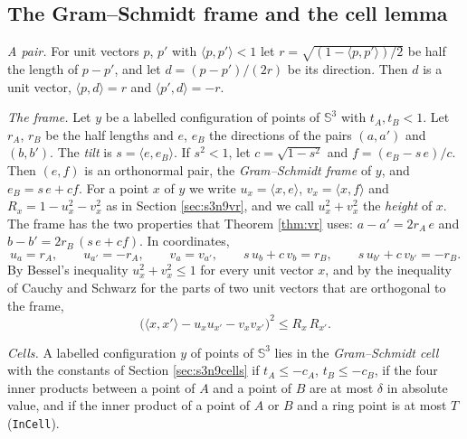 \documentclass[reqno,a4paper,11pt]{amsart}
\numberwithin{equation}{section}
\newcommand{\Sph}{\mathbb{S}}
\newcommand{\lean}[1]{\texttt{#1}}
\begin{document}
\subsection{The Gram--Schmidt frame and the cell lemma}\label{sec:frame}

\emph{A pair.} For unit vectors $p$, $p'$ with $\langle p, p' \rangle < 1$ let $r = \sqrt{(1 - \langle p, p' \rangle)/2}$ be half the length of $p - p'$, and let $d = (p - p')/(2r)$ be its direction. Then $d$ is a unit vector, $\langle p, d \rangle = r$ and $\langle p', d \rangle = -r$.

\emph{The frame.} Let $y$ be a labelled configuration of points of $\Sph^3$ with $t_A, t_B < 1$. Let $r_A$, $r_B$ be the half lengths and $e$, $e_B$ the directions of the pairs $(a, a')$ and $(b, b')$. The \emph{tilt} is $s = \langle e, e_B \rangle$. If $s^2 < 1$, let $c = \sqrt{1 - s^2}$ and $f = (e_B - s \, e)/c$. Then $(e, f)$ is an orthonormal pair, the \emph{Gram--Schmidt frame} of $y$, and $e_B = s \, e + c f$. For a point $x$ of $y$ we write $u_x = \langle x, e \rangle$, $v_x = \langle x, f \rangle$ and $R_x = 1 - u_x^2 - v_x^2$ as in Section \ref{sec:s3n9vr}, and we call $u_x^2 + v_x^2$ the \emph{height} of $x$. The frame has the two properties that Theorem \ref{thm:vr} uses: $a - a' = 2 r_A \, e$ and $b - b' = 2 r_B \, (s \, e + c f)$. In coordinates,
\begin{equation}\label{eq:frameid}
u_a = r_A, \qquad u_{a'} = -r_A, \qquad v_a = v_{a'}, \qquad s \, u_b + c \, v_b = r_B, \qquad s \, u_{b'} + c \, v_{b'} = -r_B .
\end{equation}
By Bessel's inequality $u_x^2 + v_x^2 \leq 1$ for every unit vector $x$, and by the inequality of Cauchy and Schwarz for the parts of two unit vectors that are orthogonal to the frame,
\begin{equation}\label{eq:framecs}
\big( \langle x, x' \rangle - u_x u_{x'} - v_x v_{x'} \big)^2 \leq R_x \, R_{x'} .
\end{equation}

\emph{Cells.} A labelled configuration $y$ of points of $\Sph^3$ lies in the \emph{Gram--Schmidt cell} with the constants of Section \ref{sec:s3n9cells} if $t_A \leq -c_A$, $t_B \leq -c_B$, if the four inner products between a point of $A$ and a point of $B$ are at most $\delta$ in absolute value, and if the inner product of a point of $A$ or $B$ and a ring point is at most $T$ (\lean{InCell}).
\end{document}
